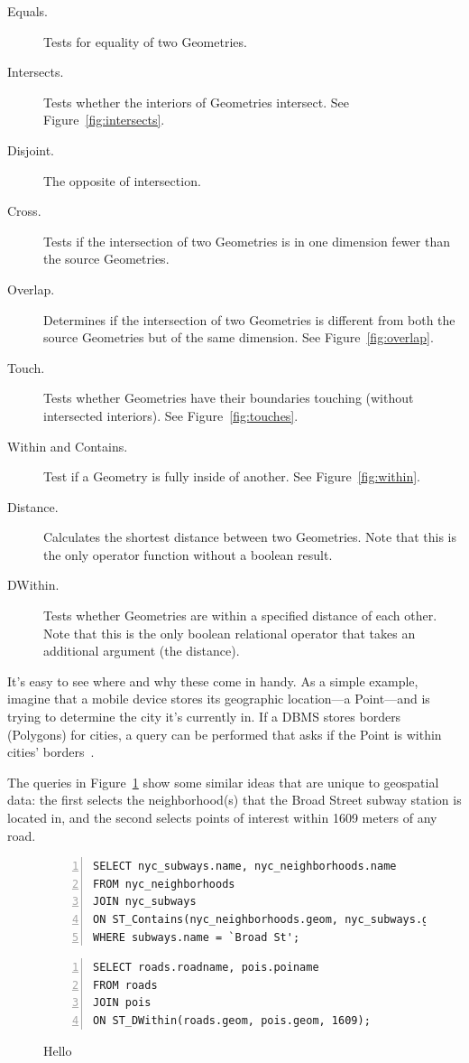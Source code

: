 \begin{description}
  \item[Equals.] Tests for equality of two Geometries.
  \item[Intersects.] Tests whether the interiors of Geometries intersect. See Figure~\ref{fig:intersects}.
  \item[Disjoint.] The opposite of intersection.
  \item[Cross.] Tests if the intersection of two Geometries is in one dimension fewer than the source Geometries.
  \item[Overlap.] Determines if the intersection of two Geometries is different from both the source Geometries but of the same dimension. See Figure~\ref{fig:overlap}.
  \item[Touch.] Tests whether Geometries have their boundaries touching (without intersected interiors). See Figure~\ref{fig:touches}.
  \item[Within and Contains.] Test if a Geometry is fully inside of another. See Figure~\ref{fig:within}.
  \item[Distance.] Calculates the shortest distance between two Geometries. Note that this is the only operator function without a boolean result.
  \item[DWithin.] Tests whether Geometries are within a specified distance of each other. Note that this is the only boolean relational operator that takes an additional argument (the distance).
\end{description}

It's easy to see where and why these come in handy. As a simple example, imagine that a mobile device stores its geographic location---a Point---and is trying to determine the city it's currently in. If a DBMS stores borders (Polygons) for cities, a query can be performed that asks if the Point is within cities' borders~\cite{Boundless}.

The queries in Figure~\ref{fig:spatialselect1} show some similar ideas that are unique to geospatial data: the first selects the neighborhood(s) that the Broad Street subway station is located in, and the second selects points of interest within 1609 meters of any road.

\begin{figure}
\begin{Verbatim}[samepage=true,baselinestretch=1,numbers=left,xleftmargin=12mm]
SELECT nyc_subways.name, nyc_neighborhoods.name
FROM nyc_neighborhoods
JOIN nyc_subways
ON ST_Contains(nyc_neighborhoods.geom, nyc_subways.geom)
WHERE subways.name = `Broad St';
\end{Verbatim}

\begin{Verbatim}[samepage=true,baselinestretch=1,numbers=left,xleftmargin=12mm]
SELECT roads.roadname, pois.poiname
FROM roads
JOIN pois 
ON ST_DWithin(roads.geom, pois.geom, 1609);
\end{Verbatim}
\caption{Hello}
\label{fig:spatialselect1}
\end{figure}

